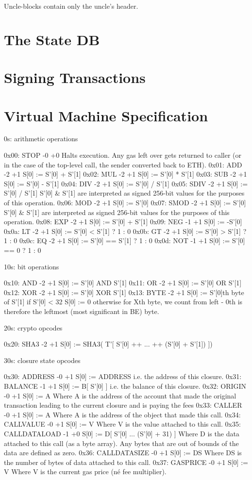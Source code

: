 \documentclass[9pt,oneside]{amsart}
\begin{document}
\begin{multicols}{2}
Uncle-blocks contain only the uncle's header.

\section{The State DB}\label{app:state}

\section{Signing Transactions}\label{app:signing}

\section{Virtual Machine Specification}\label{app:vm}

0s: arithmetic operations

0x00: STOP -0 +0
Halts execution.
Any gas left over gets returned to caller (or in the case of the top-level call, the sender converted back to ETH).
0x01: ADD -2 +1
S[0] := S'[0] + S'[1]
0x02: MUL -2 +1
S[0] := S'[0] * S'[1]
0x03: SUB -2 +1
S[0] := S'[0] - S'[1]
0x04: DIV -2 +1
S[0] := S'[0] / S'[1]
0x05: SDIV -2 +1
S[0] := S'[0] / S'[1]
S'[0] \& S'[1] are interpreted as signed 256-bit values for the purposes of this operation.
0x06: MOD -2 +1
S[0] := S'[0] %
0x07: SMOD -2 +1
S[0] := S'[0] %
S'[0] \& S'[1] are interpreted as signed 256-bit values for the purposes of this operation.
0x08: EXP -2 +1
S[0] := S'[0] + S'[1]
0x09: NEG -1 +1
S[0] := -S'[0]
0x0a: LT -2 +1
S[0] := S'[0] < S'[1] ? 1 : 0
0x0b: GT -2 +1
S[0] := S'[0] > S'[1] ? 1 : 0
0x0c: EQ -2 +1
S[0] := S'[0] == S'[1] ? 1 : 0
0x0d: NOT -1 +1
S[0] := S'[0] == 0 ? 1 : 0

10s: bit operations

0x10: AND -2 +1
S[0] := S'[0] AND S'[1]
0x11: OR -2 +1
S[0] := S'[0] OR S'[1]
0x12: XOR -2 +1
S[0] := S'[0] XOR S'[1]
0x13: BYTE -2 +1
S[0] := S'[0]th byte of S'[1]
if S'[0] < 32
S[0] := 0
otherwise
for Xth byte, we count from left - 0th is therefore the leftmost (most significant in BE) byte.

20s: crypto opcodes

0x20: SHA3 -2 +1
S[0] := SHA3( T'[ S'[0] ++ ... ++ (S'[0] + S'[1]) ])

30s: closure state opcodes

0x30: ADDRESS -0 +1
S[0] := ADDRESS
i.e. the address of this closure.
0x31: BALANCE -1 +1
S[0] := B[ S'[0] ]
i.e. the balance of this closure.
0x32: ORIGIN -0 +1
S[0] := A
Where A is the address of the account that made the original transaction leading to the current closure and is paying the fees
0x33: CALLER -0 +1
S[0] := A
Where A is the address of the object that made this call.
0x34: CALLVALUE -0 +1
S[0] := V
Where V is the value attached to this call.
0x35: CALLDATALOAD -1 +0
S[0] := D[ S'[0] ... (S'[0] + 31) ]
Where D is the data attached to this call (as a byte array).
Any bytes that are out of bounds of the data are defined as zero.
0x36: CALLDATASIZE -0 +1
S[0] := DS
Where DS is the number of bytes of data attached to this call.
0x37: GASPRICE -0 +1
S[0] := V
Where V is the current gas price (né fee multiplier).


\end{multicols}
\end{document}
